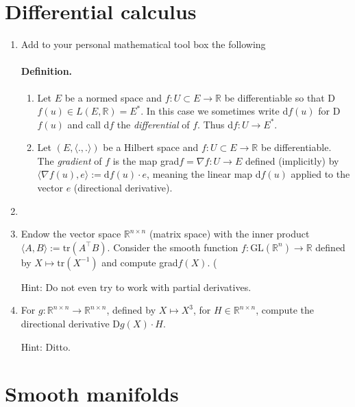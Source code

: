 \documentclass{article}
\begin{document}
\section{Differential calculus}

\begin{enumerate}[start=9]
  \item Add to your personal mathematical tool box the following
  \paragraph{Definition.}

  \begin{enumerate}
    \item Let $E$ be a normed space and $f:U\subset E\rightarrow\mathbb{R}$ be differentiable so that D$f(u)\in L(E,\mathbb{R})=E^{*}$. In this case we sometimes write d$f(u)$ for D$f(u)$ and call d$f$ the \textit{differential} of $f$. Thus d$f:U\rightarrow E^{*}$.

    \item Let $(E, \langle.,.\rangle)$ be a Hilbert space and $f:U\subset E\rightarrow\mathbb{R}$ be differentiable. The \textit{gradient} of $f$ is the map grad$f=\nabla f:U\rightarrow E$ defined (implicitly) by $\langle\nabla f(u), e\rangle:=\text{d}f(u)\cdot e$, meaning the linear map d$f(u)$ applied to the vector $e$ (directional derivative).
  \end{enumerate}

  \item

  \item Endow the vector space $\mathbb{R}^{n\times n}$ (matrix space) with the inner product $\langle A,B\rangle:=\text{tr}(A^{\top}B)$. Consider the smooth function $f:\text{GL}(\mathbb{R}^{n})\rightarrow\mathbb{R}$ defined by $X\mapsto\text{tr}(X^{-1})$ and compute grad$f(X)$. (

  {\footnotesize Hint: Do not even try to work with partial derivatives.}

  \item For $g:\mathbb{R}^{n\times n}\rightarrow\mathbb{R}^{n\times n}$, defined by $X\mapsto X^{3}$, for $H\in\mathbb{R}^{n\times n}$, compute the directional derivative D$g(X)\cdot H$.

  {\footnotesize Hint: Ditto.}
\end{enumerate}

\section{Smooth manifolds}
\end{document}
